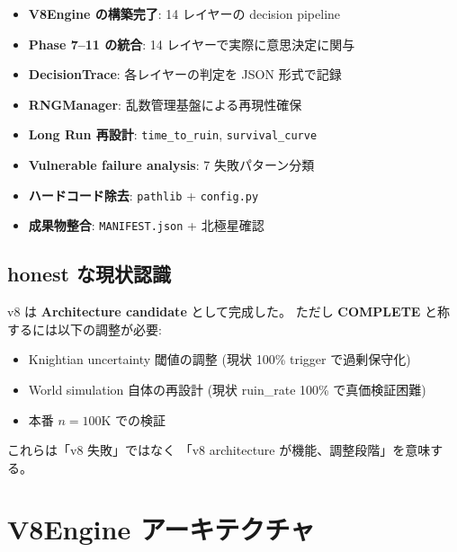\documentclass[a4paper,11pt]{report}
\begin{document}
\begin{achieved}
\begin{itemize}[leftmargin=*]
  \item \textbf{V8Engine の構築完了}: 14 レイヤーの decision pipeline
  \item \textbf{Phase 7--11 の統合}: 14 レイヤーで実際に意思決定に関与
  \item \textbf{DecisionTrace}: 各レイヤーの判定を JSON 形式で記録
  \item \textbf{RNGManager}: 乱数管理基盤による再現性確保
  \item \textbf{Long Run 再設計}: \texttt{time\_to\_ruin}, \texttt{survival\_curve}
  \item \textbf{Vulnerable failure analysis}: 7 失敗パターン分類
  \item \textbf{ハードコード除去}: \texttt{pathlib} + \texttt{config.py}
  \item \textbf{成果物整合}: \texttt{MANIFEST.json} + 北極星確認
\end{itemize}
\end{achieved}

\section{honest な現状認識}

\begin{honest}
v8 は \textbf{Architecture candidate} として完成した。
ただし \textbf{COMPLETE} と称するには以下の調整が必要:

\begin{itemize}[leftmargin=*]
  \item Knightian uncertainty 閾値の調整
    (現状 100\% trigger で過剰保守化)
  \item World simulation 自体の再設計
    (現状 ruin\_rate 100\% で真価検証困難)
  \item 本番 $n=100\mathrm{K}$ での検証
\end{itemize}

これらは「v8 失敗」ではなく
「v8 architecture が機能、調整段階」を意味する。
\end{honest}

\chapter{V8Engine アーキテクチャ}
\end{document}
